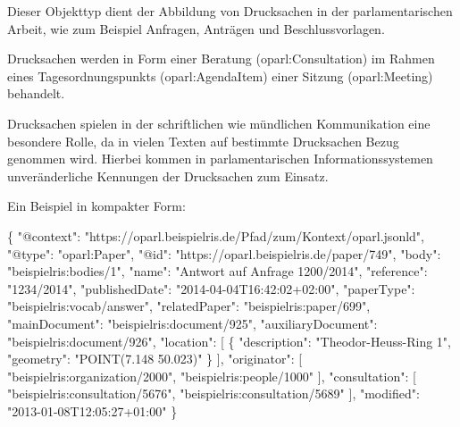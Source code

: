 \documentclass[,a4paper]{article}
\newenvironment{Shaded}{}{}
\newcommand{\DataTypeTok}[1]{\textcolor[rgb]{0.56,0.13,0.00}{{#1}}}
\newcommand{\StringTok}[1]{\textcolor[rgb]{0.25,0.44,0.63}{{#1}}}
\newcommand{\OtherTok}[1]{\textcolor[rgb]{0.00,0.44,0.13}{{#1}}}
\newcommand{\FunctionTok}[1]{\textcolor[rgb]{0.02,0.16,0.49}{{#1}}}
\begin{document}

Dieser Objekttyp dient der Abbildung von Drucksachen in der
parlamentarischen Arbeit, wie zum Beispiel Anfragen, Anträgen und
Beschlussvorlagen.

Drucksachen werden in Form einer Beratung (oparl:Consultation) im Rahmen
eines Tagesordnungspunkts (oparl:AgendaItem) einer Sitzung
(oparl:Meeting) behandelt.

Drucksachen spielen in der schriftlichen wie mündlichen Kommunikation
eine besondere Rolle, da in vielen Texten auf bestimmte Drucksachen
Bezug genommen wird. Hierbei kommen in parlamentarischen
Informationssystemen unveränderliche Kennungen der Drucksachen zum
Einsatz.

Ein Beispiel in kompakter Form:

\begin{Shaded}
\begin{Highlighting}[]
\FunctionTok{\{}
    \DataTypeTok{"@context"}\FunctionTok{:} \StringTok{"https://oparl.beispielris.de/Pfad/zum/Kontext/oparl.jsonld"}\FunctionTok{,}
    \DataTypeTok{"@type"}\FunctionTok{:} \StringTok{"oparl:Paper"}\FunctionTok{,}
    \DataTypeTok{"@id"}\FunctionTok{:} \StringTok{"https://oparl.beispielris.de/paper/749"}\FunctionTok{,}
    \DataTypeTok{"body"}\FunctionTok{:} \StringTok{"beispielris:bodies/1"}\FunctionTok{,}
    \DataTypeTok{"name"}\FunctionTok{:} \StringTok{"Antwort auf Anfrage 1200/2014"}\FunctionTok{,}
    \DataTypeTok{"reference"}\FunctionTok{:} \StringTok{"1234/2014"}\FunctionTok{,}
    \DataTypeTok{"publishedDate"}\FunctionTok{:} \StringTok{"2014-04-04T16:42:02+02:00"}\FunctionTok{,}
    \DataTypeTok{"paperType"}\FunctionTok{:} \StringTok{"beispielris:vocab/answer"}\FunctionTok{,}
    \DataTypeTok{"relatedPaper"}\FunctionTok{:} \StringTok{"beispielris:paper/699"}\FunctionTok{,}
    \DataTypeTok{"mainDocument"}\FunctionTok{:} \StringTok{"beispielris:document/925"}\FunctionTok{,}
    \DataTypeTok{"auxiliaryDocument"}\FunctionTok{:} \StringTok{"beispielris:document/926"}\FunctionTok{,}
    \DataTypeTok{"location"}\FunctionTok{:} \OtherTok{[}
        \FunctionTok{\{}
            \DataTypeTok{"description"}\FunctionTok{:} \StringTok{"Theodor-Heuss-Ring 1"}\FunctionTok{,}
            \DataTypeTok{"geometry"}\FunctionTok{:} \StringTok{"POINT(7.148  50.023)"}
        \FunctionTok{\}}
    \OtherTok{]}\FunctionTok{,}
    \DataTypeTok{"originator"}\FunctionTok{:} \OtherTok{[}
        \StringTok{"beispielris:organization/2000"}\OtherTok{,}
        \StringTok{"beispielris:people/1000"}
    \OtherTok{]}\FunctionTok{,}
    \DataTypeTok{"consultation"}\FunctionTok{:} \OtherTok{[}
        \StringTok{"beispielris:consultation/5676"}\OtherTok{,}
        \StringTok{"beispielris:consultation/5689"}
    \OtherTok{]}\FunctionTok{,}
    \DataTypeTok{"modified"}\FunctionTok{:} \StringTok{"2013-01-08T12:05:27+01:00"}
\FunctionTok{\}}
\end{Highlighting}
\end{Shaded}
\end{document}
